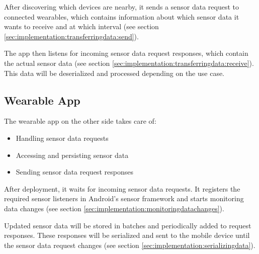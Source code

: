After discovering which devices are nearby, it sends a sensor data request to connected wearables, which contains information about which sensor data it wants to receive and at which interval (see section \ref{sec:implementation:transferringdata:send}).

The app then listens for incoming sensor data request responses, which contain the actual sensor data (see section \ref{sec:implementation:transferringdata:receive}).
This data will be deserialized and processed depending on the use case.

\subsection{Wearable App}
\label{sec:concept:wearableapp}
The wearable app on the other side takes care of:
\begin{itemize}[noitemsep]
	\item Handling sensor data requests
	\item Accessing and persisting sensor data
	\item Sending sensor data request responses
\end{itemize}

After deployment, it waits for incoming sensor data requests.
It registers the required sensor listeners in Android's sensor framework and starts monitoring data changes (see section \ref{sec:implementation:monitoringdatachanges}).

Updated sensor data will be stored in batches and periodically added to request responses.
These responses will be serialized and sent to the mobile device until the sensor data request changes (see section \ref{sec:implementation:serializingdata}).

\clearpage